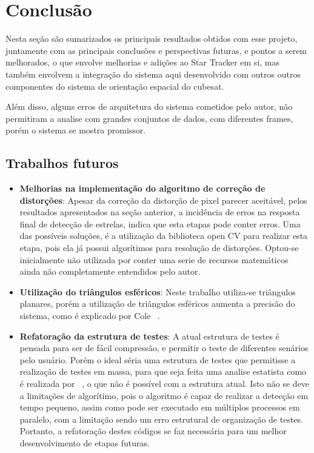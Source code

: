 \chapter*[Conclusão]{Conclusão}
\label{cap:Conclusao_init}

Nesta seção são sumarizados os principais resultados obtidos com esse projeto, 
juntamente com as principais conclusões e perspectivas futuras, e pontos a serem melhorados, 
o que envolve melhorias e adições ao Star Tracker em si, 
mas também envolvem a integração do sistema aqui desenvolvido com outros outros componentes do sistema de orientação espacial do cubesat.

Além disso, alguns erros de arquitetura do sistema cometidos pelo autor, não permitiram a analise com grandes conjuntos de dados, 
com diferentes frames, porém o sistema se mostra promissor.

\section*{Trabalhos futuros}
\begin{itemize}
	\item \textbf{Melhorias na implementação do algoritmo de correção de distorções}: Apesar da correção da distorção de pixel parecer aceitável, 
	pelos resultados apresentados na seção anterior, a incidência de erros na resposta final de detecção de estrelas, indica que esta etapas pode conter erros. 
	Uma das possíveis soluções, é a utilização da biblioteca open CV para realizar esta etapa, pois ela já possui algorítimos para resolução de distorções. 
	Optou-se inicialmente não utilizada por conter uma serie de recursos matemáticos ainda não completamente entendidos pelo autor. 
	\item \textbf{Utilização do triângulos esféricos}: Neste trabalho utiliza-se triângulos planares, porém a utilização de triângulos esféricos aumenta a precisão do sistema, 
	como é explicado por Cole ~\cite{Cole_2}.
	\item \textbf{Refatoração da estrutura de testes}: A atual estrutura de testes é pensada para ser de fácil compressão, 
	e permitir o teste de diferentes senários pelo usuário. 
	Porém o ideal séria uma estrutura de testes que permitisse a realização de testes em massa, 
	para que seja feita uma analise estatista como é realizada por ~\cite{Cole_2}, 
	o que não é possível com a estrutura atual.  
	Isto não se deve a limitações de algorítimo, 
	pois o algoritmo é capaz de realizar a detecção em tempo pequeno, 
	assim como pode ser executado em múltiplos processos em paralelo, 
	com a limitação sendo um erro estrutural de organização de testes. 
	Portanto, a refatoração destes códigos se faz necessária para um melhor desenvolvimento de etapas futuras. 
\end{itemize}

